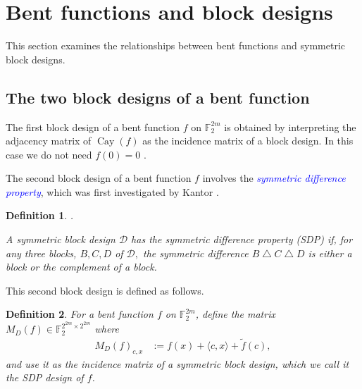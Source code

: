 \documentclass[12pt,a4paper]{article}
\newcommand{\mb}[1]{\mathbb{#1}}
\newcommand{\F}{\mb{F}}
\newcommand{\Emph}[1]{\emph{\textcolor{blue}{#1}}}
\newcommand{\Cay}[1]{\operatorname{Cay}\left(#1\right)}
\newcommand{\dual}[1]{\widetilde{#1}}
\newtheorem{Definition}{Definition}
\begin{document}
\section{Bent functions and block designs}
\label{sec-Bent-designs}

This section examines the relationships between bent functions and symmetric block designs.



%
\subsection{The two block designs of a bent function}

The first block design of a bent function $f$ on $\F_2^{2m}$ is obtained by interpreting
the adjacency matrix of $\Cay{f}$ as the incidence matrix of a block design.
In this case we do not need $f(0)=0$ \cite[p. 160]{DilS87block}.

The second block design of a bent function $f$ involves the
\Emph{symmetric difference property}, which was first investigated by Kantor
\cite[Section 5]{Kan75symplectic}.
\begin{Definition}
\label{def-Symmetric-difference-property}
\cite[p. 49]{Kan75symplectic}.

A symmetric block design $\mathcal{D}$ has the symmetric difference property (SDP)
if, for any three blocks, $B, C, D$ of $\mathcal{D},$ the symmetric difference
$B \bigtriangleup C \bigtriangleup D$ is either a block or the complement of a block.
\end{Definition}

This second block design is defined as follows.
\begin{Definition}
\label{def-SDP-design}
For a bent function  $f$ on $\F_2^{2m}$, define the matrix $M_D(f) \in \F_2^{2^{2m} \times 2^{2m}}$ where
\begin{align}
M_D(f)_{c,x} &:= f(x) + \langle c, x \rangle + \dual{f}(c),
\label{D-f-def}
\end{align}
and use it as the incidence matrix of a symmetric block design, which
we call it the \emph{SDP design} of $f$.
\end{Definition}
\end{document}
